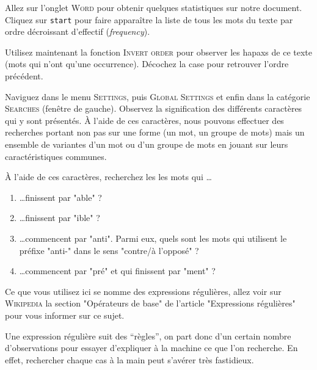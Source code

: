  Allez sur l'onglet \textsc{Word} pour obtenir quelques statistiques sur notre document.
 Cliquez sur \texttt{start} pour faire apparaître la liste de tous les mots du texte par ordre décroissant d'effectif (\textit{frequency}).
 
 Utilisez maintenant la fonction \textsc{Invert order} pour observer les hapaxs de ce texte (mots qui n'ont qu'une occurrence). Décochez la case pour retrouver l'ordre précédent.




Naviguez dans le menu \textsc{Settings}, puis \textsc{Global Settings} et enfin dans la catégorie \textsc{Searches} (fenêtre de gauche). Observez la signification des différents caractères qui y sont présentés.
À l'aide de ces caractères, nous pouvons effectuer des recherches portant non pas sur une forme (un mot, un groupe de mots) mais un ensemble de variantes d'un mot ou d'un groupe de mots en jouant sur leurs caractéristiques communes.

À l'aide de ces caractères, recherchez les les mots qui \dots

\begin{enumerate}
    \item \dots finissent par "able" ?
    \item \dots finissent par "ible" ?
    \item \dots commencent par "anti". Parmi eux, quels sont les mots qui utilisent le préfixe "anti-" dans le sens "contre/à l'opposé" ?
    \item \dots commencent par "pré" et qui finissent par "ment" ? %
\end{enumerate}

 Ce que vous utilisez ici se nomme des expressions régulières, allez voir sur \textsc{Wikipedia} la section "Opérateurs de base" de l'article "Expressions régulières" pour vous informer sur ce sujet.


 Une expression régulière suit des ``règles'', on part donc d'un certain nombre d'observations pour essayer d'expliquer à la machine ce que l'on recherche. En effet, rechercher chaque cas à la main peut s'avérer très fastidieux.

